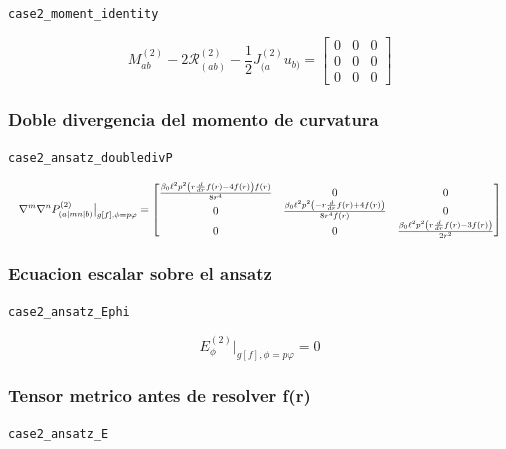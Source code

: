 \documentclass[11pt,a4paper]{article}
\begin{document}
\noindent\texttt{case2\_moment\_identity}\par\nopagebreak[4]

\[
M^{(2)}_{ab}-2\mathcal R^{(2)}_{(ab)}-\frac12J^{(2)}_{(a}u_{b)} = \left[\begin{matrix}0 & 0 & 0\\0 & 0 & 0\\0 & 0 & 0\end{matrix}\right]
\]

\subsubsection{Doble divergencia del momento de curvatura}

\noindent\texttt{case2\_ansatz\_doubledivP}\par\nopagebreak[4]

\[
\resizebox{\textwidth}{!}{$\displaystyle \nabla^m\nabla^nP^{(2)}_{(a|mn|b)}\big|_{g[f],\phi=p\varphi} = \left[\begin{matrix}\frac{\beta_{0} \ell^{2} p^{2} \left(r \frac{d}{d r} f{\left(r \right)} - 4 f{\left(r \right)}\right) f{\left(r \right)}}{8 r^{4}} & 0 & 0\\0 & \frac{\beta_{0} \ell^{2} p^{2} \left(- r \frac{d}{d r} f{\left(r \right)} + 4 f{\left(r \right)}\right)}{8 r^{4} f{\left(r \right)}} & 0\\0 & 0 & \frac{\beta_{0} \ell^{2} p^{2} \left(r \frac{d}{d r} f{\left(r \right)} - 3 f{\left(r \right)}\right)}{2 r^{2}}\end{matrix}\right]$}
\]

\subsubsection{Ecuacion escalar sobre el ansatz}

\noindent\texttt{case2\_ansatz\_Ephi}\par\nopagebreak[4]

\[
E^{(2)}_\phi\big|_{g[f],\phi=p\varphi} = 0
\]

\subsubsection{Tensor metrico antes de resolver f(r)}

\noindent\texttt{case2\_ansatz\_E}\par\nopagebreak[4]
\end{document}
